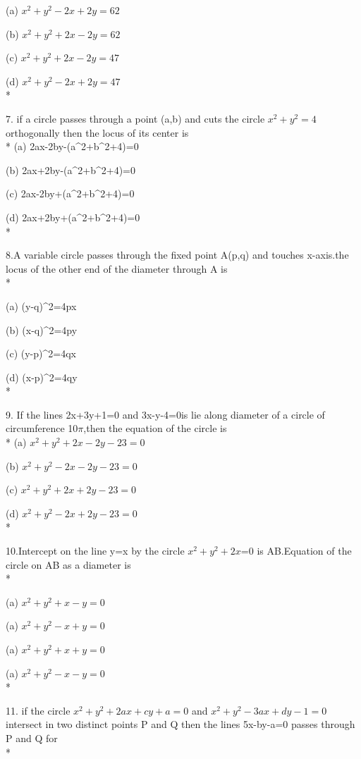 \documentclass{article}
\begin{document}
\choice (a) $x^2+y^2-2x+2y=62$ 

\choice (b) $x^2+y^2+2x-2y=62$ 

\choice (c) $x^2+y^2+2x-2y=47$ 

\choice (d) $x^2+y^2-2x+2y=47$ \\*

7. if a circle passes through a point (a,b) and cuts the circle $x^2+y^2=4$ orthogonally then the locus of its center is\\*
\choice (a) 2ax-2by-(a^2+b^2+4)=0

\choice (b) 2ax+2by-(a^2+b^2+4)=0

\choice (c) 2ax-2by+(a^2+b^2+4)=0

\choice (d) 2ax+2by+(a^2+b^2+4)=0\\*

8.A variable circle passes through the fixed point A(p,q) and touches x-axis.the locus of the other end of the diameter through A is\\*

\choice (a) (y-q)^2=4px

\choice (b) (x-q)^2=4py

\choice (c) (y-p)^2=4qx

\choice (d) (x-p)^2=4qy\\*

9. If the lines 2x+3y+1=0 and 3x-y-4=0is lie along diameter of a circle of circumference 10$\pi$,then the equation of the circle is\\*
\choice (a) $x^2+y^2+2x-2y-23=0$ 

\choice (b) $x^2+y^2-2x-2y-23=0$ 

\choice (c) $x^2+y^2+2x+2y-23=0$ 

\choice (d) $x^2+y^2-2x+2y-23=0$ \\*

10.Intercept on the line y=x by the circle $x^2+y^2+2x$=0 is AB.Equation of the circle on AB as a diameter is\\*

\choice (a) $x^2+y^2+x-y=0$ 

\choice (a) $x^2+y^2-x+y=0$ 

\choice (a) $x^2+y^2+x+y=0$ 

\choice (a) $x^2+y^2-x-y=0$ \\*

11. if the circle $x^2+y^2+2ax+cy+a=0$ and $x^2+y^2-3ax+dy-1=0$ intersect in two distinct points P and Q then the lines 5x-by-a=0 passes through P and Q for\\*
\end{document}
